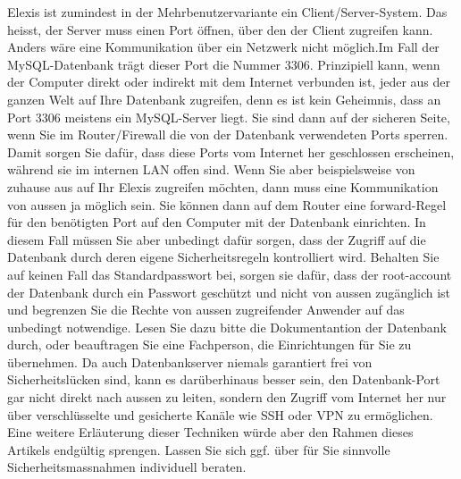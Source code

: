 Elexis ist zumindest in der Mehrbenutzervariante ein Client/Server-System. Das heisst, der Server muss einen Port öffnen,
über den der Client zugreifen kann. Anders wäre eine Kommunikation über ein Netzwerk nicht möglich.Im Fall der MySQL-Datenbank trägt dieser
Port die Nummer 3306. Prinzipiell kann, wenn der Computer direkt oder indirekt mit dem Internet verbunden ist, jeder aus der ganzen Welt auf
Ihre Datenbank zugreifen, denn es ist kein Geheimnis, dass an Port 3306 meistens ein MySQL-Server liegt. Sie sind dann auf der sicheren Seite,
wenn Sie im Router/Firewall die von der Datenbank verwendeten Ports sperren. Damit sorgen Sie dafür, dass diese Ports vom Internet her
geschlossen erscheinen, während sie im internen LAN offen sind. Wenn Sie aber beispielsweise von zuhause aus auf Ihr Elexis zugreifen
möchten, dann muss eine Kommunikation von aussen ja möglich sein. Sie können
dann auf dem Router eine \glqq forward\grqq -Regel für den benötigten
Port auf den Computer mit der Datenbank einrichten. In diesem Fall müssen Sie aber unbedingt dafür sorgen, dass der Zugriff auf die Datenbank
durch deren eigene Sicherheitsregeln kontrolliert wird. Behalten Sie auf keinen Fall das Standardpasswort bei, sorgen sie dafür, dass der
root-account der Datenbank durch ein Passwort geschützt und nicht von aussen zugänglich ist und begrenzen Sie die Rechte von aussen zugreifender
Anwender auf das unbedingt notwendige. Lesen Sie dazu bitte die Dokumentantion der Datenbank durch, oder beauftragen Sie eine Fachperson,
die Einrichtungen für Sie zu übernehmen. Da auch Datenbankserver niemals garantiert frei von Sicherheitslücken sind, kann es
darüberhinaus besser sein, den Datenbank-Port gar nicht direkt nach aussen zu leiten, sondern den Zugriff vom Internet her nur über
verschlüsselte und gesicherte Kanäle wie SSH oder VPN zu ermöglichen. Eine weitere Erläuterung dieser Techniken würde aber den Rahmen
dieses Artikels endgültig sprengen. Lassen Sie sich ggf. über für Sie sinnvolle Sicherheitsmassnahmen individuell beraten.

